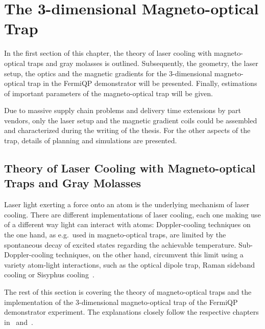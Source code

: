 \renewcommand{\imagepath}{../30-mot/img}

\chapter{The 3-dimensional Magneto-optical Trap}

In the first section of this chapter, the theory of laser cooling with magneto-optical traps and gray molasses is outlined. Subsequently, the geometry, the laser setup, the optics and the magnetic gradients for the 3-dimensional magneto-optical trap in the FermiQP demonstrator will be presented. Finally, estimations of important parameters of the magneto-optical trap will be given.

Due to massive supply chain problems and delivery time extensions by part vendors, only the laser setup and the magnetic gradient coils could be assembled and characterized during the writing of the thesis. For the other aspects of the trap, details of planning and simulations are presented.

\section{Theory of Laser Cooling with Magneto-optical Traps and Gray Molasses}

Laser light exerting a force onto an atom is the underlying mechanism of laser cooling. There are different implementations of laser cooling, each one making use of a different way light can interact with atoms: Doppler-cooling techniques on the one hand, as e.g.\ used in magneto-optical traps, are limited by the spontaneous decay of excited states regarding the achievable temperature. Sub-Doppler-cooling techniques, on the other hand, circumvent this limit using a variety atom-light interactions, such as the optical dipole trap, Raman sideband cooling or Sisyphus cooling~\cite{foot_atomic_2005}.

The rest of this section is covering the theory of magneto-optical traps and the implementation of the 3-dimensional magneto-optical trap of the FermiQP demonstrator experiment. The explanations closely follow the respective chapters in~\cite{foot_atomic_2005} and~\cite{metcalf_laser_1999}.


